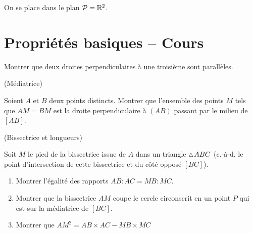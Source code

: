 \documentclass[a4paper,11pt,reqno]{amsart}
\begin{document}

\vspace{-3mm}
\begin{convention}
  On se place dans le plan $\mathcal{P}=\mathbb{R}^2$.
\end{convention}

\section{Propriétés basiques -- Cours}


\begin{exo}[.35]

  Montrer que deux droites perpendiculaires à une troisième sont parallèles.
\end{exo}

\begin{exo}[.49] (Médiatrice)

  Soient $A$ et $B$ deux points distincts. Montrer que l'ensemble des points $M$ tels que $AM=BM$ est la droite perpendiculaire à $(AB)$ passant par le milieu de $[AB]$.
\end{exo}

\begin{exo} (Bissectrice et longueurs)

  Soit $M$ le pied de la bissectrice issue de $A$ dans un triangle $\tri ABC$ (c.-à-d. le point d'intersection de cette bissectrice et du côté opposé $[BC]$).
  \begin{enumerate}
    \item Montrer l'égalité des rapports $AB:AC=MB:MC$.
    \item Montrer que la bissectrice $AM$ coupe le cercle circonscrit en un point $P$ qui est sur la médiatrice de $[BC]$.
    \item Montrer que $AM^{2} = AB \times AC - MB \times MC$
  \end{enumerate}
\end{exo}
\end{document}
